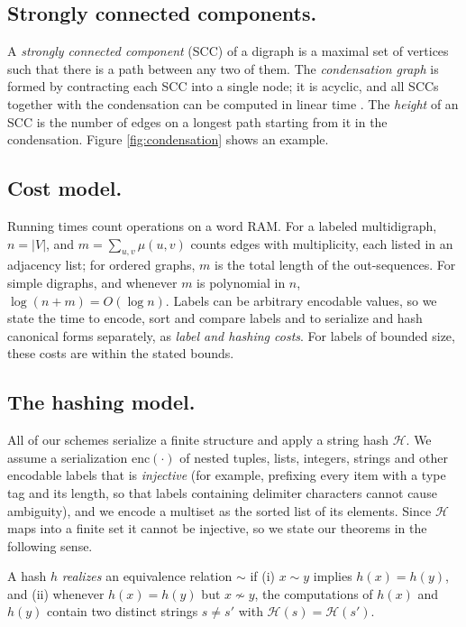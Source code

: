 \documentclass[twoside,leqno]{article}
\newcommand{\enc}{\mathrm{enc}}
\begin{document}

\subsection{Strongly connected components.}
A \textit{strongly connected component} (SCC) of a digraph is a maximal set of vertices such that there is a path between any two of them. The \textit{condensation graph} is formed by contracting each SCC into a single node; it is acyclic, and all SCCs together with the condensation can be computed in linear time \cite{tarjan1972depth}. The \emph{height} of an SCC is the number of edges on a longest path starting from it in the condensation. Figure \ref{fig:condensation} shows an example.

\subsection{Cost model.}
\label{sec:cost-model}
Running times count operations on a word RAM. For a labeled multidigraph, $n=|V|$, and $m=\sum_{u,v}\mu(u,v)$ counts edges with multiplicity, each listed in an adjacency list; for ordered graphs, $m$ is the total length of the out-sequences. For simple digraphs, and whenever $m$ is polynomial in $n$, $\log(n+m)=O(\log n)$. Labels can be arbitrary encodable values, so we state the time to encode, sort and compare labels and to serialize and hash canonical forms separately, as \emph{label and hashing costs}. For labels of bounded size, these costs are within the stated bounds.

\subsection{The hashing model.}
\label{sec:hash-model}
All of our schemes serialize a finite structure and apply a string hash $\mathcal{H}$. We assume a serialization $\enc(\cdot)$ of nested tuples, lists, integers, strings and other encodable labels that is \emph{injective} (for example, prefixing every item with a type tag and its length, so that labels containing delimiter characters cannot cause ambiguity), and we encode a multiset as the sorted list of its elements. Since $\mathcal{H}$ maps into a finite set it cannot be injective, so we state our theorems in the following sense.

\begin{defn}
\label{def:correct}
A hash $h$ \emph{realizes} an equivalence relation $\sim$ if (i) $x \sim y$ implies $h(x)=h(y)$, and (ii) whenever $h(x) = h(y)$ but $x \not\sim y$, the computations of $h(x)$ and $h(y)$ contain two distinct strings $s \ne s'$ with $\mathcal{H}(s) = \mathcal{H}(s')$.
\end{defn}
\end{document}
